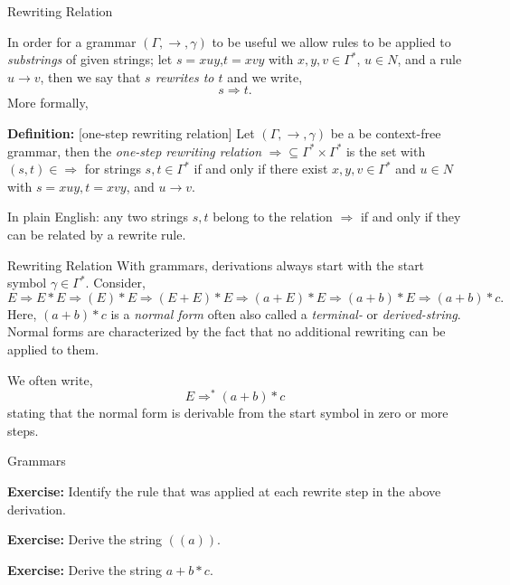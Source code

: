 \documentclass{beamer}
\begin{document}
\begin{frame}[fragile]{Rewriting Relation}

\small
In order for a grammar $(\Gamma,\rightarrow,\gamma)$ to be useful we allow rules
to be applied to {\em substrings} of given strings;
let $s = xuy$,$t=xvy$ with $x,y,v \in \Gamma^*$, $u\in N$, and a rule $u\rightarrow v$,
then we say that {\em $s$ rewrites to $t$} and we write,
\[
s \Rightarrow t.
\]
More formally,

\vspace{.1in}
{\bf Definition:} [one-step rewriting relation] Let $(\Gamma,\rightarrow,\gamma)$ be a be context-free grammar,
then the {\em one-step rewriting relation} $\Rightarrow\subseteq \Gamma^*\times\Gamma^*$ is  the set with $(s,t) \in \Rightarrow$ for strings $s,t \in\Gamma^*$
 if and only if there exist $x, y, v \in\Gamma^*$ and $u\in N$ with $s = xuy, t = xvy$, and $u\rightarrow v$.

\vspace{.1in}
In plain English: any two strings $s,t$ belong to the relation $\Rightarrow$ if and only if they can be related by
a rewrite rule.
\end{frame}



\begin{frame}[fragile]{Rewriting Relation}
With grammars, derivations always start with the start symbol $\gamma \in \Gamma^*$. Consider,
\[
E\Rightarrow E * E \Rightarrow ( E ) * E \Rightarrow ( E + E ) * E \Rightarrow (a + E) * E \Rightarrow (a + b) * E
\Rightarrow (a + b) * c.
\]
Here, $(a+b)*c$ is a {\em normal form} often also called a {\em terminal-} or {\em derived-string}.
Normal forms are characterized by the fact that no additional rewriting can be applied to them.

We often write,
\[
E \Rightarrow^* (a + b) * c
\]
stating that the normal form is derivable from the start symbol in zero or more steps.

\end{frame}




\begin{frame}[fragile]{Grammars}

{\bf Exercise:} Identify the rule that was applied at each rewrite step in the above derivation.

{\bf Exercise:} Derive the string $((a))$.

{\bf Exercise:} Derive the string $a + b * c$.

\end{frame}
\end{document}
